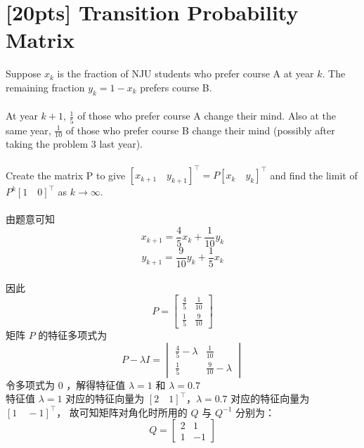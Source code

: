 \documentclass{article}
\begin{document}
	\section{[20pts] Transition Probability Matrix}
	Suppose $x_k$ is the fraction of NJU students who prefer course A at year $k$. The remaining fraction $y_k = 1-x_k$ prefers course B. \\\\
	At year $k + 1$, $\frac{1}{5}$ of those who prefer course A change their mind. Also at the same year, $\frac{1}{10}$ of those who prefer course B change their mind (possibly after taking the problem 3 last year). \\ \\ 
	Create the matrix P to give $[x_{k+1}\quad y_{k+1}]^\top = P [x_k\quad y_k]^\top$ and find the limit of $P^k[1\quad 0]^\top$ as $k \rightarrow \infty$. \\ \\
	由题意可知 
	\begin{equation}
	x_{k+1} = \frac{4}{5}x_k + \frac{1}{10}y_k 
	\end{equation}
	\begin{equation}
	y_{k+1} = \frac{9}{10}y_k + \frac{1}{5}x_k	
	\end{equation} \\
	因此
	\begin{equation}
	P = \begin{bmatrix}
		\frac{4}{5} & \frac{1}{10} \\ 
		\frac{1}{5} & \frac{9}{10} 
	   \end{bmatrix}
	\end{equation}
	矩阵 $P$ 的特征多项式为
	\begin{equation}
	P - \lambda I = \begin{vmatrix}
					\frac{4}{5}-\lambda & \frac{1}{10} \\
					\frac{1}{5} & \frac{9}{10}-\lambda
					\end{vmatrix}
	\end{equation}
	令多项式为 0 ，解得特征值 $\lambda = 1$ 和 $\lambda = 0.7$ \\
	特征值 $\lambda = 1$ 对应的特征向量为 $[2\quad 1]^\top$，$\lambda = 0.7$ 对应的特征向量为 $[1\quad -1]^\top$，
	故可知矩阵对角化时所用的 $Q$ 与 $Q^{-1}$ 分别为：
	\begin{equation}
	Q = \begin{bmatrix}
		2 & 1 \\
		1 & -1
		\end{bmatrix}
	\end{equation}
\end{document}
